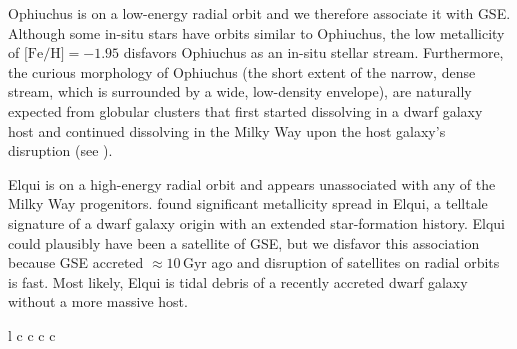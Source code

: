 \documentclass[twocolumn]{aastex63}
\newcommand{\gyr}{\ensuremath{\textrm{Gyr}}}
\newcommand{\feh}{\ensuremath{\textrm{[Fe/H]}}}
\begin{document}
Ophiuchus is on a low-energy radial orbit and we therefore associate it with GSE.
Although some in-situ stars have orbits similar to Ophiuchus, the low metallicity of $\feh=-1.95$ \citep{sesar2015} disfavors Ophiuchus as an in-situ stellar stream.
Furthermore, the curious morphology of Ophiuchus (the short extent of the narrow, dense stream, which is surrounded by a wide, low-density envelope), are naturally expected from globular clusters that first started dissolving in a dwarf galaxy host and continued dissolving in the Milky Way upon the host galaxy's disruption (see \citealt{carlberg2018, malhan2020}).


Elqui is on a high-energy radial orbit and appears unassociated with any of the Milky Way progenitors.
\citet{ji2020} found significant metallicity spread in Elqui, a telltale signature of a dwarf galaxy origin with an extended star-formation history.
Elqui could plausibly have been a satellite of GSE, but we disfavor this association because GSE accreted $\approx10\,\gyr$ ago \citep{bonaca2020c} and disruption of satellites on radial orbits is fast.
Most likely, Elqui is tidal debris of a recently accreted dwarf galaxy without a more massive host.

\begin{deluxetable*}{l c c c c}
\decimals
\startdata

\enddata
\caption{
The origins of stellar streams in the Milky Way.
Progenitor is the object that dissolved to create the stellar stream.
The last column determines the progenitor as globular cluster (GC) or dwarf galaxy (DG).
Host galaxy is the galaxy that brought the stream progenitor into the Milky Way.
Tentative host galaxy candidates and progenitors are placed in parentheses.  Unknown or very uncertain associations are labelled with ellipses.
}
\label{table}
\end{deluxetable*}
\end{document}
